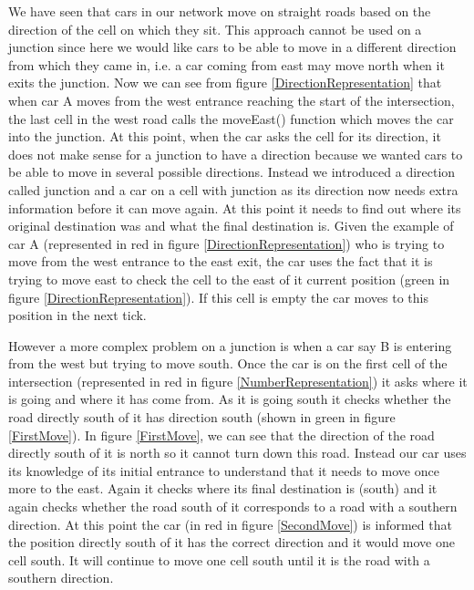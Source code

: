 \documentclass{article}
\begin{document}
We have seen that cars in our network move on straight roads based on the direction of the cell on which  they sit. This approach cannot be used on a junction since here we would like cars to be able to move in a different direction from which they came in, i.e. a car coming from east may move north when it exits the junction. Now we can see from figure \ref{DirectionRepresentation} that when car A moves from the west entrance reaching the start of the intersection, the last cell in the west road calls the moveEast() function which moves the car into the junction. At this point, when the car asks the cell for its direction, it does not make sense for a junction to have a direction because we wanted cars to be able to move in several possible directions. Instead we introduced a direction called junction and a car on a cell with junction as its direction now needs extra information before it can move again. At this point it needs to find out where its original destination was and what the final destination is. Given the example of car A (represented in red in figure \ref{DirectionRepresentation}) who is trying to move from the west entrance to the east exit, the car uses the fact that it is trying to move east to check the cell to the east of it current position (green in figure \ref{DirectionRepresentation}). If this cell is empty the car moves to this position in the next tick. 

However a more complex problem on a junction is when a car say B is entering from the west but trying to move south. Once the car is on the first cell of the intersection (represented in red in figure \ref{NumberRepresentation}) it asks where it is going and where it has come from. As it is going south it checks whether the road directly south of it has direction south (shown in green in figure \ref{FirstMove}). In figure \ref{FirstMove}, we can see that the direction of the road directly south of it is north so it cannot turn down this road. Instead our car uses its knowledge of its initial entrance to understand that it needs to move once more to the east. Again it checks where its final destination is (south) and it again checks whether the road south of it corresponds to a road with a southern direction. At this point the car (in red in figure \ref{SecondMove}) is informed that the position directly south of it has the correct direction and it would move one cell south. It will continue to move one cell south until it is the road with a southern direction. 
\end{document}
